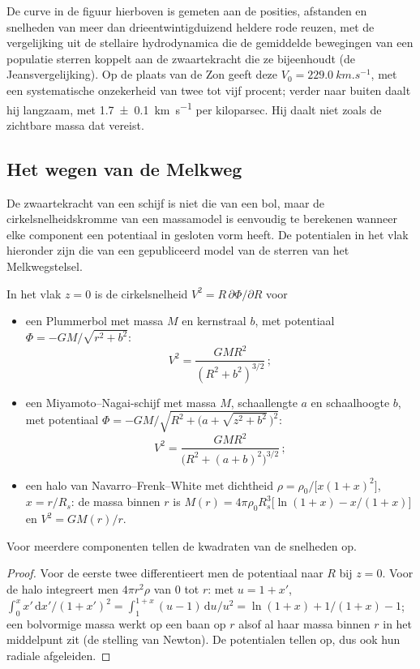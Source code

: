 De curve in de figuur hierboven is gemeten aan de posities, afstanden
en snelheden van meer dan drieentwintigduizend heldere rode reuzen,
met de vergelijking uit de stellaire hydrodynamica die de gemiddelde bewegingen
van een populatie sterren koppelt aan de zwaartekracht die ze bijeenhoudt (de Jeansvergelijking).
Op de plaats van de Zon geeft deze $V_0 = \qty{229.0}{km.s^{-1}}$, met een
systematische onzekerheid van twee tot vijf procent; verder naar buiten daalt
hij langzaam, met \qty[separate-uncertainty=true]{1.7 \pm 0.1}{km.s^{-1}} per kiloparsec. Hij
daalt niet zoals de zichtbare massa dat vereist.

\subsection*{Het wegen van de Melkweg}

De zwaartekracht van een schijf is niet die van een bol, maar de cirkelsnelheidskromme van een
massamodel is eenvoudig te berekenen wanneer elke component een potentiaal in
gesloten vorm heeft. De potentialen in het vlak hieronder zijn die van een gepubliceerd
model van de sterren van het Melkwegstelsel.

\begin{proposition}\label{prop:b3:milky-way-galaxies:models}
In het vlak $z = 0$ is de cirkelsnelheid $V^2 = R\,\partial\Phi/\partial R$
voor
\begin{itemize}
\item een Plummerbol met massa $M$ en kernstraal $b$, met potentiaal
  $\Phi = -GM/\sqrt{r^2 + b^2}$:
  \[ V^2 = \frac{GMR^2}{(R^2 + b^2)^{3/2}}\,; \]
\item een Miyamoto--Nagai-schijf met massa $M$, schaallengte $a$ en schaalhoogte
  $b$, met potentiaal
  $\Phi = -GM\big/\sqrt{R^2 + \bigl(a + \sqrt{z^2 + b^2}\,\bigr)^2}$:
  \[ V^2 = \frac{GMR^2}{\bigl(R^2 + (a + b)^2\bigr)^{3/2}}\,; \]
\item een halo van Navarro--Frenk--White met dichtheid
  $\rho = \rho_0\big/\bigl[x(1 + x)^2\bigr]$, $x = r/R_s$: de massa binnen $r$
  is $M(r) = 4\pi\rho_0R_s^3\bigl[\ln(1 + x) - x/(1 + x)\bigr]$ en
  $V^2 = GM(r)/r$.
\end{itemize}
Voor meerdere componenten tellen de kwadraten van de snelheden op.
\end{proposition}

\begin{proof}
Voor de eerste twee differentieert men de potentiaal naar $R$ bij
$z = 0$. Voor de halo integreert men $4\pi r^2\rho$ van 0 tot $r$: met
$u = 1 + x'$, $\int_0^x x'\,\mathrm{d}x'/(1 + x')^2 =
\int_1^{1+x}(u - 1)\,\mathrm{d}u/u^2 = \ln(1 + x) + 1/(1 + x) - 1$; een
bolvormige massa werkt op een baan op $r$ alsof al haar massa binnen $r$ in
het middelpunt zit (de stelling van Newton). De potentialen tellen op, dus ook
hun radiale afgeleiden.
\end{proof}

